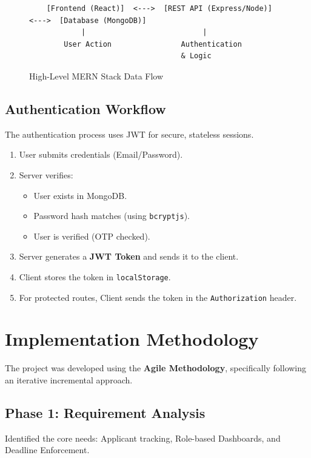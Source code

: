 \documentclass[12pt, a4paper]{report}
\begin{document}
\begin{figure}[h]
    \centering
    \begin{verbatim}
    [Frontend (React)]  <--->  [REST API (Express/Node)]  <--->  [Database (MongoDB)]
            |                           |
        User Action                Authentication
                                   & Logic
    \end{verbatim}
    \caption{High-Level MERN Stack Data Flow}
\end{figure}

\subsection{Authentication Workflow}
The authentication process uses JWT for secure, stateless sessions.
\begin{enumerate}
    \item User submits credentials (Email/Password).
    \item Server verifies:
    \begin{itemize}
        \item User exists in MongoDB.
        \item Password hash matches (using \texttt{bcryptjs}).
        \item User is verified (OTP checked).
    \end{itemize}
    \item Server generates a \textbf{JWT Token} and sends it to the client.
    \item Client stores the token in \texttt{localStorage}.
    \item For protected routes, Client sends the token in the \texttt{Authorization} header.
\end{enumerate}

\section{Implementation Methodology}
The project was developed using the \textbf{Agile Methodology}, specifically following an iterative incremental approach.

\subsection{Phase 1: Requirement Analysis}
Identified the core needs: Applicant tracking, Role-based Dashboards, and Deadline Enforcement.
\end{document}
